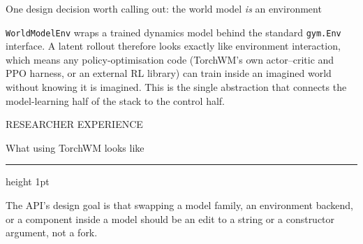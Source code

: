 \documentclass[10pt,a4paper]{article}
\newcommand{\kicker}[1]{{\footnotesize\displayfont\color{accent}\MakeUppercase{#1}}}
\newcommand{\pagetitle}[2]{%
  \kicker{#1}\par\vspace{1.5mm}
  {\Huge\displayfont\color{ink} #2}\par\vspace{2.5mm}
  {\color{rule}\hrule height 1pt}\par\vspace{4mm}}
\newcommand{\subhead}[1]{{\displayfont\color{ink} #1}\par\vspace{1mm}}
\newcommand{\badge}[3]{\tcbox[on line,boxsep=0pt,left=3pt,right=3pt,top=1.4pt,bottom=1.4pt,
  boxrule=0pt,arc=2pt,colback=#1,coltext=#2]{\scriptsize\displayfont\MakeUppercase{#3}}}
\newcommand{\bimpl}{\badge{greensoft}{green}{implemented}}
\begin{document}
\vspace{2.5mm}
\begin{callout}
{\footnotesize
\subhead{One design decision worth calling out: the world model \emph{is} an environment}
\texttt{WorldModelEnv} wraps a trained dynamics model behind the standard \texttt{gym.Env}
interface. A latent rollout therefore looks exactly like environment interaction, which means any
policy-optimisation code (TorchWM's own actor–critic and PPO harness, or an external RL library)
can train inside an imagined world without knowing it is imagined. This is the single abstraction
that connects the model-learning half of the stack to the control half. \bimpl}
\end{callout}

\newpage
\pagetitle{Researcher experience}{What using TorchWM looks like}

{\footnotesize
The API's design goal is that swapping a model family, an environment backend, or a component
inside a model should be an edit to a string or a constructor argument, not a fork.}

\vspace{3.5mm}
\end{document}
